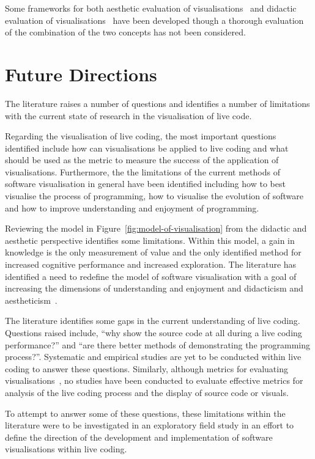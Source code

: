 Some frameworks for both aesthetic evaluation of visualisations~\cite{Cawthon2007,Purchase1996} and didactic evaluation of visualisations~\cite{VanWijk2005} have been developed though a thorough evaluation of the combination of the two concepts has not been considered.

\section{Future Directions}

The literature raises a number of questions and identifies a number of limitations with the current state of research in the visualisation of live code.

Regarding the visualisation of live coding, the most important questions identified include how can visualisations be applied to live coding and what should be used as the metric to measure the success of the application of visualisations. Furthermore, the the limitations of the current methods of software visualisation in general have been identified including how to best visualise the process of programming, how to visualise the evolution of software~\cite{Gall1999} and how to improve understanding and enjoyment of programming.

Reviewing the model in Figure~\ref{fig:model-of-visualisation} from the didactic and aesthetic perspective identifies some limitations. Within this model, a gain in knowledge is the only measurement of value and the only identified method for increased cognitive performance and increased exploration. The literature has identified a need to redefine the model of software visualisation with a goal of increasing the dimensions of understanding and enjoyment and didacticism and aestheticism~.

The literature identifies some gaps in the current understanding of live coding. Questions raised include, ``why show the source code at all during a live coding performance?'' and ``are there better methods of demonstrating the programming process?''. Systematic and empirical studies are yet to be conducted within live coding to answer these questions. Similarly, although metrics for evaluating visualisations~, no studies have been conducted to evaluate effective metrics for analysis of the live coding process and the display of source code or visuals.

To attempt to answer some of these questions, these limitations within the literature were to be investigated in an exploratory field study in an effort to define the direction of the development and implementation of software visualisations within live coding.


